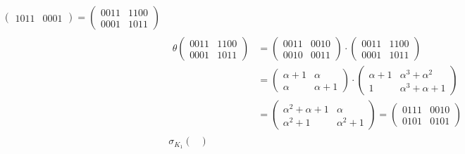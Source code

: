 \documentclass[fleqn]{article}
\begin{document}
\begin{equation*}
\begin{aligned}
\begin{pmatrix}
                1011 & 0001
            \end{pmatrix} =
            \begin{pmatrix}
                0011 & 1100 \\
                0001 & 1011
            \end{pmatrix} \\
            &\begin{aligned} 
                \theta 
                \begin{pmatrix}
                    0011 & 1100 \\
                    0001 & 1011
                \end{pmatrix} &=
                \begin{pmatrix}
                    0011 & 0010 \\
                    0010 & 0011
                \end{pmatrix} \cdot
                \begin{pmatrix}
                    0011 & 1100 \\
                    0001 & 1011
                \end{pmatrix} \\ &= 
                 \begin{pmatrix}
                    \alpha + 1 & \alpha \\
                    \alpha & \alpha + 1
                 \end{pmatrix} \cdot
                    \begin{pmatrix} 
                        \alpha + 1 & \alpha^3 + \alpha^2 \\
                        1 & \alpha^3 + \alpha + 1
                    \end{pmatrix} \\ &=
                    \begin{pmatrix}
                        \alpha^2 + \alpha + 1 & \alpha \\
                        \alpha^2 + 1 & \alpha^2 + 1
                    \end{pmatrix} = 
                    \begin{pmatrix}
                        0111 & 0010 \\
                        0101 & 0101
                    \end{pmatrix}
            \end{aligned} \\
            &\sigma_{K_1} \begin{pmatrix}

\end{pmatrix}
\end{aligned}
\end{equation*}
\end{document}
